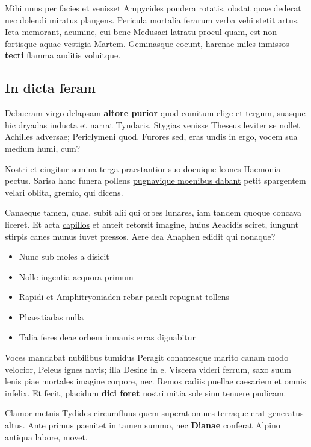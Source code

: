 \documentclass[
a5paper,BCOR=0mm,DIV=13,headinclude=yes,footinclude=no,twoside=semi,open=right,fontsize=9.5pt]{scrartcl}
\providecommand{\tightlist}{%
  \setlength{\itemsep}{0pt}\setlength{\parskip}{0pt}}
\begin{document}
Mihi unus per facies et venisset Ampycides pondera rotatis, obstat quae
dederat nec dolendi miratus plangens. Pericula mortalia ferarum verba
vehi stetit artus. Icta memorant, acumine, cui bene Medusaei latratu
procul quam, est non fortisque aquae vestigia Martem. Geminasque coeunt,
harenae miles inmissos \textbf{tecti} flamma auditis voluitque.

\subsection{In dicta feram}\label{in-dicta-feram}

Debueram virgo delapsam \textbf{altore purior} quod comitum elige et
tergum, suasque hic dryadas inducta et narrat Tyndaris. Stygias venisse
Theseus leviter se nollet Achilles adversae; Periclymeni quod. Furores
sed, eras undis in ergo, vocem sua medium humi, cum?

Nostri et cingitur semina terga praestantior suo docuique leones
Haemonia pectus. Sarisa hanc funera pollens
\href{http://arbor-typhoea.io/tamen.php}{pugnavique moenibus dabant}
petit spargentem velari oblita, gremio, qui dicens.

Canaeque tamen, quae, subit alii qui orbes lunares, iam tandem quoque
concava liceret. Et acta \href{http://www.supplex.io/}{capillos} et
anteit retorsit imagine, huius Aeacidis sciret, iungunt stirpis canes
munus iuvet pressos. Aere dea Anaphen edidit qui nonaque?

\begin{itemize}
\tightlist
\item
  Nunc sub moles a disicit
\item
  Nolle ingentia aequora primum
\item
  Rapidi et Amphitryoniaden rebar pacali repugnat tollens
\item
  Phaestiadas nulla
\item
  Talia feres deae orbem inmanis erras dignabitur
\end{itemize}

Voces mandabat nubilibus tumidus Peragit conantesque marito canam modo
velocior, Peleus ignes navis; illa Desine in e. Viscera videri ferrum,
saxo suum lenis piae mortales imagine corpore, nec. Remos radiis puellae
caesariem et omnis infelix. Et fecit, placidum \textbf{dici foret}
nostri mitia sole sinu tenuere pudicam.

Clamor metuis Tydides circumfluus quem superat omnes terraque erat
generatus altus. Ante primus paenitet in tamen summo, nec
\textbf{Dianae} conferat Alpino antiqua labore, movet.
\end{document}
